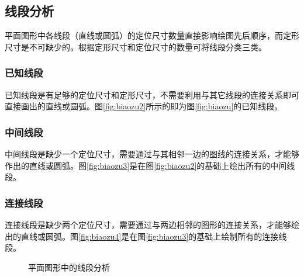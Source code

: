 \subsection{线段分析}
平面图形中各线段（直线或圆弧）的定位尺寸数量直接影响绘图先后顺序，而定形尺寸是不可缺少的。根据定形尺寸和定位尺寸的数量可将线段分类三类。

\subsubsection{已知线段}
已知线段是有足够的定位尺寸和定形尺寸，不需要利用与其它线段的连接关系即可直接画出的直线或圆弧。图\ref{fig:biaozu2}所示的即为图\ref{fig:biaozu}的已知线段。

\subsubsection{中间线段} 

中间线段是缺少一个定位尺寸，需要通过与其相邻一边的图线的连接关系，才能够作出的直线或圆弧。图\ref{fig:biaozu3}是在图\ref{fig:biaozu2}的基础上绘出所有的中间线段。
\subsubsection{连接线段} 

连接线段是缺少两个定位尺寸，需要通过与两边相邻的图形的连接关系，才能够绘出的直线或圆弧。图\ref{fig:biaozu4}是在图\ref{fig:biaozu3}的基础上绘制所有的连接线段。

\begin{figure}[htbp]
\centering
{}\hspace{20pt}
\hspace{20pt}
\caption{平面图形中的线段分析}
\end{figure}
